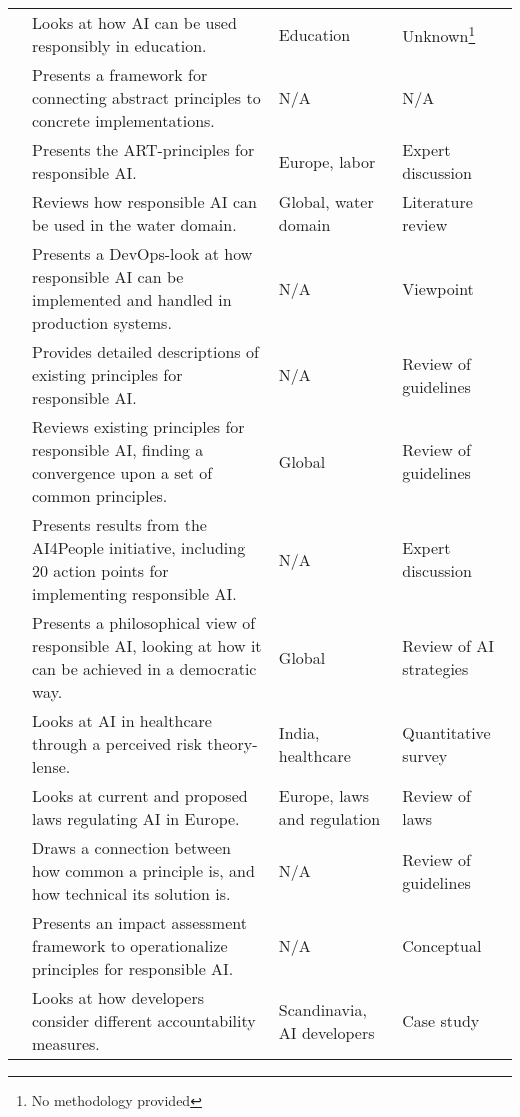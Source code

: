 \begin{table}[!ht]
\begin{tabular}{lp{}lp{}}
        \textcite{Dignum_2021} & Looks at how AI can be used responsibly in education. & Education & Unknown\footnote{No methodology provided} \\ 
        \textcite{Dignum_2019} & Presents a framework for connecting abstract principles to concrete implementations. & N/A & N/A \\ 
        \textcite{Dignum_2017} & Presents the ART-principles for responsible AI. & Europe, labor & Expert discussion \\ 
        \textcite{Doorn_2021} & Reviews how responsible AI can be used in the water domain. & Global, water domain & Literature review \\ 
        \textcite{Eitel‑Porter_2021} & Presents a DevOps-look at how responsible AI can be implemented and handled in production systems. & N/A & Viewpoint \\ 
        \textcite{Fjeld_2020} & Provides detailed descriptions of existing principles for responsible AI. & N/A & Review of guidelines \\ 
        \textcite{Floridi_2019} & Reviews existing principles for responsible AI, finding a convergence upon a set of common principles. & Global & Review of guidelines \\ 
        \textcite{Floridi_2018} & Presents results from the AI4People initiative, including 20 action points for implementing responsible AI. & N/A & Expert discussion \\ 
        \textcite{Gianni_2022} & Presents a philosophical view of responsible AI, looking at how it can be achieved in a democratic way. & Global & Review of AI strategies \\ 
        \textcite{Gupta_2021} & Looks at AI in healthcare through a perceived risk theory-lense. & India, healthcare & Quantitative survey \\ 
        \textcite{Hacker_2022} & Looks at current and proposed laws regulating AI in Europe. & Europe, laws and regulation & Review of laws \\ 
        \textcite{Hagendorff_2020} & Draws a connection between how common a principle is, and how technical its solution is. & N/A & Review of guidelines \\ 
        \textcite{Havrda_2020} & Presents an impact assessment framework to operationalize principles for responsible AI. & N/A & Conceptual \\ 
        \textcite{Henriksen_2021} & Looks at how developers consider different accountability measures. & Scandinavia, AI developers & Case study \\ 

\end{tabular}
\end{table}
